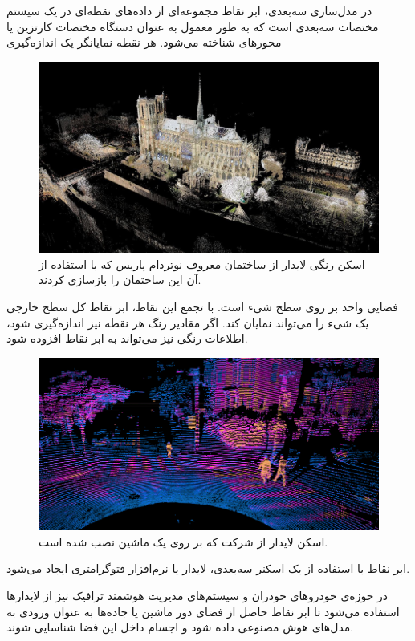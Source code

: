 در مدل‌سازی سه‌بعدی، ابر نقاط مجموعه‌ای از داده‌های نقطه‌ای در یک سیستم مختصات سه‌بعدی است که به طور معمول به عنوان دستگاه مختصات کارتزین یا محورهای   شناخته می‌شود.
هر نقطه نمایانگر یک اندازه‌گیری
\begin{figure}[h]
    \centering
    \includegraphics[width=0.84\linewidth]{figures/notre_dame_lidar_scan.png}
    \caption{اسکن رنگی لایدار از ساختمان معروف نوتردام پاریس که با استفاده از آن این ساختمان را بازسازی کردند.}
    \label{fig:notre_dame_lidar}
\end{figure}
فضایی واحد بر روی سطح شیء است. با تجمع این نقاط، ابر نقاط کل سطح خارجی یک شیء را می‌تواند نمایان کند. اگر مقادیر رنگ هر نقطه نیز اندازه‌گیری شود، اطلاعات رنگی نیز می‌تواند به ابر نقاط افزوده شود.
\begin{figure}[h]
    \centering
    \includegraphics[width=0.84\linewidth]{vehicle_lidar_scan.png}
    \caption{اسکن لایدار  از شرکت  که بر روی یک ماشین نصب شده است.}
    \label{fig:vehicle_lidar_scan}
\end{figure}
ابر نقاط با استفاده از یک اسکنر سه‌بعدی، لایدار یا نرم‌افزار فتوگرامتری ایجاد می‌شود.

در حوزه‌ی خودروهای خودران و سیستم‌های مدیریت هوشمند ترافیک نیز از لایدارها استفاده می‌شود تا ابر نقاط حاصل از فضای دور ماشین یا جاده‌ها به عنوان ورودی به مدل‌های هوش مصنوعی داده شود و اجسام داخل این فضا شناسایی شوند.

